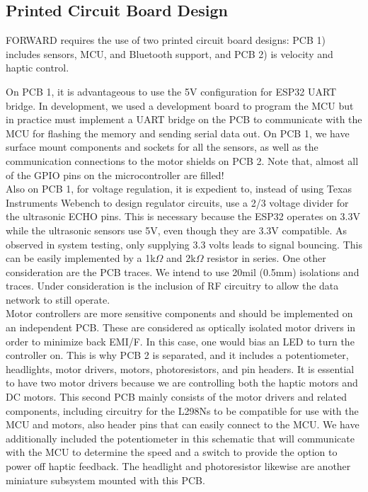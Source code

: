 \subsection{Printed Circuit Board Design} \label{sec:pcb-design}
\noindent FORWARD requires the use of two printed circuit board designs: PCB 1) includes sensors, MCU, and Bluetooth support, and PCB 2)  is velocity and haptic control.

\noindent On PCB 1, it is advantageous to use the 5V configuration for ESP32 UART bridge. In development, we used a development board to program the MCU but in practice must implement a UART bridge on the PCB to communicate with the MCU for flashing the memory and sending serial data out. On PCB 1, we have surface mount components and sockets for all the sensors, as well as the communication connections to the motor shields on PCB 2.  Note that, almost all of the GPIO pins on the microcontroller are filled!\\

\noindent Also on PCB 1, for voltage regulation, it is expedient to, instead of using Texas Instruments Webench to design regulator circuits, use a 2/3 voltage divider for the ultrasonic ECHO pins. This is necessary because the ESP32 operates on 3.3V while the ultrasonic sensors use 5V, even though they are 3.3V compatible. As observed in system testing, only supplying 3.3 volts leads to signal bouncing. This can be easily implemented by a 1k$\Omega$ and 2k$\Omega$ resistor in series. One other consideration are the PCB traces. We intend to use 20mil (0.5mm) isolations and traces. Under consideration is the inclusion of RF circuitry to allow the data network to still operate.\\

\noindent Motor controllers are more sensitive components and should be implemented on an independent PCB. These are considered as optically isolated motor drivers in order to minimize back EMI/F. In this case, one would bias an LED to turn the controller on. This is why PCB 2 is separated, and it includes a potentiometer, headlights, motor drivers, motors, photoresistors, and pin headers. It is essential to have two motor drivers because we are controlling both the haptic motors and DC motors. This second PCB mainly consists of the motor drivers and related components, including circuitry for the L298Ns to be compatible for use with the MCU and motors, also header pins that can easily connect to the MCU. We have additionally included the potentiometer in this schematic that will communicate with the MCU to determine the speed and a switch to provide the option to power off haptic feedback. The headlight and photoresistor likewise are another miniature subsystem mounted with this PCB. \\

